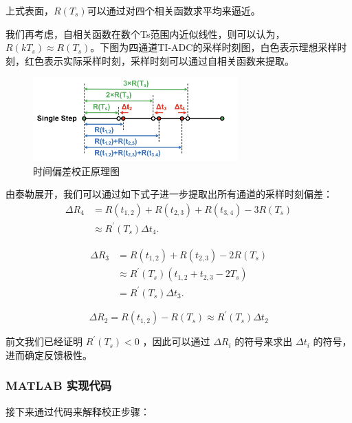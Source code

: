 \documentclass[cs4size,a4paper]{ctexart}
\numberwithin{equation}{section}
\numberwithin{table}{section}
\numberwithin{figure}{section}
\begin{document}
		上式表面，$R(T_s)$可以通过对四个相关函数求平均来逼近。
		
		我们再考虑，自相关函数在数个Ts范围内近似线性，则可以认为，$R(k T_s)\approx R(T_s)$。下图为四通道TI-ADC的采样时刻图，白色表示理想采样时刻，红色表示实际采样时刻，采样时刻可以通过自相关函数来提取。
		
		\begin{figure}[H]
			\centering
			\includegraphics[width=0.7\textwidth]{figure/cor1.png}
			\caption{时间偏差校正原理图} \label{fig:cor1}
		\end{figure}
		
		由泰勒展开，我们可以通过如下式子进一步提取出所有通道的采样时刻偏差：
		\begin{equation}
			\begin{aligned}
				\Delta R_4 & =R\left(t_{1,2}\right)+R\left(t_{2,3}\right)+R\left(t_{3,4}\right)-3 R\left(T_s\right) \\
				& \approx R^{\prime}\left(T_s\right) \Delta t_4 .
			\end{aligned}
		\end{equation}
		
		\begin{equation}
			\begin{aligned}
				\Delta R_3 & =R\left(t_{1,2}\right)+R\left(t_{2,3}\right)-2 R\left(T_s\right) \\
				& \approx R^{\prime}\left(T_s\right)\left(t_{1,2}+t_{2,3}-2 T_s\right) \\
				& =R^{\prime}\left(T_s\right) \Delta t_3 .
			\end{aligned}
		\end{equation}
		
		\begin{equation}
			\Delta R_2=R\left(t_{1,2}\right)-R\left(T_s\right) \approx R^{\prime}\left(T_s\right) \Delta t_2
		\end{equation}
		
		前文我们已经证明 $R^{\prime}(T_s)<0$ ，因此可以通过 $\Delta R_i$ 的符号来求出 $\Delta t_i$ 的符号，进而确定反馈极性。

			
		\subsubsection{MATLAB 实现代码}
		接下来通过代码来解释校正步骤：
		
\end{document}
